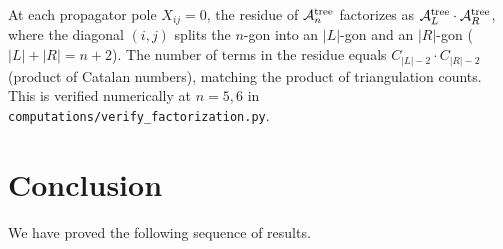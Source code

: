 \begin{remark}
\label{rmk:factorization}
At each propagator pole $X_{ij} = 0$, the residue of
$\mathcal{A}_n^{\mathrm{tree}}$ factorizes as
$\mathcal{A}_L^{\mathrm{tree}} \cdot \mathcal{A}_R^{\mathrm{tree}}$,
where the diagonal $(i,j)$ splits the $n$-gon into an
$|L|$-gon and an $|R|$-gon ($|L| + |R| = n + 2$).
The number of terms in the residue equals
$C_{|L|-2} \cdot C_{|R|-2}$ (product of Catalan numbers),
matching the product of triangulation counts.
This is verified numerically at $n = 5, 6$ in
\texttt{computations/verify\_factorization.py}.
\end{remark}

\section{Conclusion}
\label{sec:conclusion}

We have proved the following sequence of results.

